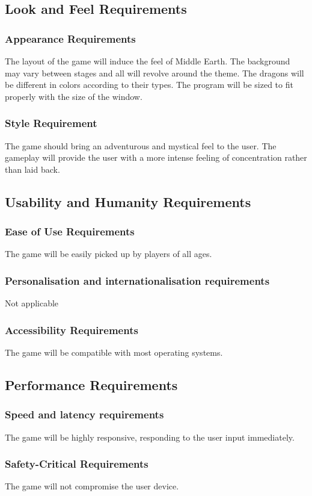 \documentclass{article}
\begin{document}
\subsection{Look and Feel Requirements}
\subsubsection{Appearance Requirements}
The layout of the game will induce the feel of Middle Earth. The background may vary between stages and all will revolve around the theme. The dragons will be different in colors according to their types. The program will be sized to fit properly with the size of the window.
\subsubsection{Style Requirement}
The game should bring an adventurous and mystical feel to the user. The gameplay will provide the user with a more intense feeling of concentration rather than laid back.

\subsection{Usability and Humanity Requirements}
\subsubsection{Ease of Use Requirements}
The game will be easily picked up by players of all ages.
\subsubsection{Personalisation and internationalisation requirements}
Not applicable
\subsubsection{Accessibility Requirements}
The game will be compatible with most operating systems.

\subsection{Performance Requirements}
\subsubsection{Speed and latency requirements}
The game will be highly responsive, responding to the user input immediately.
\subsubsection{Safety-Critical Requirements}
The game will not compromise the user device.
\end{document}
